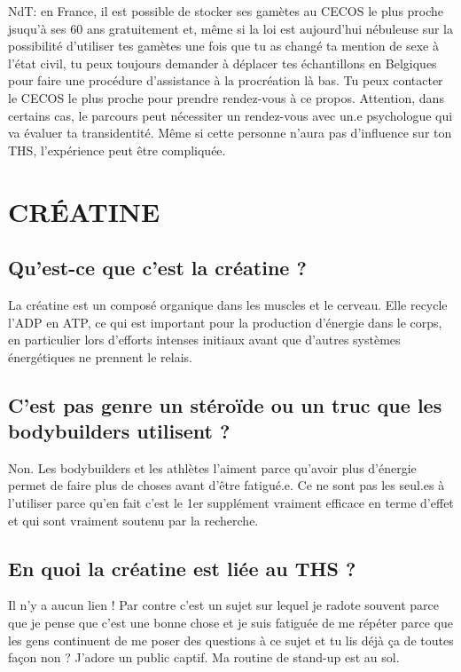 \documentclass{article}
\begin{document}
NdT: en France, il est possible de stocker ses gamètes au CECOS le plus proche jsuqu'à ses 60 ans gratuitement et, même si la loi est aujourd'hui nébuleuse sur la possibilité d'utiliser tes gamètes une fois que tu as changé ta mention de sexe à l'état civil, tu peux toujours demander à déplacer tes échantillons en Belgiques pour faire une procédure d'assistance à la procréation là bas. Tu peux contacter le CECOS le plus proche pour prendre rendez-vous à ce propos. Attention, dans certains cas, le parcours peut nécessiter un rendez-vous avec un.e psychologue qui va évaluer ta transidentité. Même si cette personne n'aura pas d'influence sur ton THS, l'expérience peut être compliquée.

\section{CRÉATINE}

\subsection{Qu'est-ce que c'est la créatine ?}

La créatine est un composé organique dans les muscles et le cerveau. Elle recycle l'ADP en ATP, ce qui est important pour la production d'énergie dans le corps, en particulier lors d'efforts intenses initiaux avant que d'autres systèmes énergétiques ne prennent le relais. 

\subsection{C'est pas genre un stéroïde ou un truc que les bodybuilders utilisent ?}

Non. Les bodybuilders et les athlètes l'aiment parce qu'avoir plus d'énergie permet de faire plus de choses avant d'être fatigué.e. Ce ne sont pas les seul.es à l'utiliser parce qu'en fait c'est le 1er supplément vraiment efficace en terme d'effet et qui sont vraiment soutenu par la recherche.

\subsection{En quoi la créatine est liée au THS ?}

Il n'y a aucun lien ! Par contre c'est un sujet sur lequel je radote souvent parce que je pense que c'est une bonne chose et je suis fatiguée de me répéter parce que les gens continuent de me poser des questions à ce sujet et tu lis déjà ça de toutes façon non ? J'adore un public captif. Ma routine de stand-up est au sol.
\end{document}
